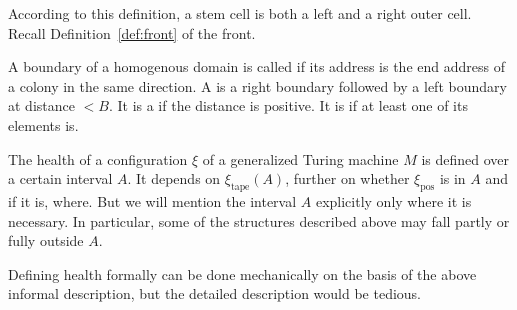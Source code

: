 \documentclass[11pt]{memoir}
\theoremstyle{definition} %
\newcommand{\fld}[1]{\ensuremath{\textit{#1\/}}}
\def\B{B}
\newcommand{\pos}{\mathrm{pos}}
\newcommand{\Drift}{\fld{Drift}}
\newcommand{\tape}{\mathrm{tape}}
\begin{document}
According to this definition, a stem cell is both a left and a right outer cell.
Recall Definition~\ref{def:front} of the front.


\begin{definition}[Boundaries]%

A boundary of a homogenous domain is called  if its address is the end 
address of a colony in the same direction.
A  
is a right boundary followed by a left boundary at distance \( <\B \).
It is a  if the distance is positive.
It is  if at least one of its elements is.
\end{definition}

The health of a configuration \( \xi \) of a generalized Turing machine 
\( M \) is defined over a certain interval \( A \).
It depends on \( \xi_{\tape}(A) \), further on whether \( \xi_{\pos} \) is in \( A \) and
if it is, where.
But we will mention the interval \( A \) explicitly only where it is necessary.
In particular, some of the structures described above may fall partly or fully
outside \( A \).

Defining health formally can be done mechanically on the basis of the above informal description,
but the detailed description would be tedious.


\end{document}
